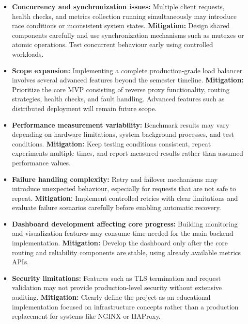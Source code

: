 \documentclass[11pt,a4paper]{article}
\begin{document}
\begin{itemize}

    \item \textbf{Concurrency and synchronization issues:} Multiple client requests, health checks, and metrics collection running simultaneously may introduce race conditions or inconsistent system states.  
    \textbf{Mitigation:} Design shared components carefully and use synchronization mechanisms such as mutexes or atomic operations. Test concurrent behaviour early using controlled workloads.

    \item \textbf{Scope expansion:} Implementing a complete production-grade load balancer involves several advanced features beyond the semester timeline.  
    \textbf{Mitigation:} Prioritize the core MVP consisting of reverse proxy functionality, routing strategies, health checks, and fault handling. Advanced features such as distributed deployment will remain future scope.

    \item \textbf{Performance measurement variability:} Benchmark results may vary depending on hardware limitations, system background processes, and test conditions.  
    \textbf{Mitigation:} Keep testing conditions consistent, repeat experiments multiple times, and report measured results rather than assumed performance values.

    \item \textbf{Failure handling complexity:} Retry and failover mechanisms may introduce unexpected behaviour, especially for requests that are not safe to repeat.  
    \textbf{Mitigation:} Implement controlled retries with clear limitations and evaluate failure scenarios carefully before enabling automatic recovery.

    \item \textbf{Dashboard development affecting core progress:} Building monitoring and visualization features may consume time needed for the main backend implementation.  
    \textbf{Mitigation:} Develop the dashboard only after the core routing and reliability components are stable, using already available metrics APIs.

    \item \textbf{Security limitations:} Features such as TLS termination and request validation may not provide production-level security without extensive auditing.  
    \textbf{Mitigation:} Clearly define the project as an educational implementation focused on infrastructure concepts rather than a production replacement for systems like NGINX or HAProxy.

\end{itemize}
\end{document}
